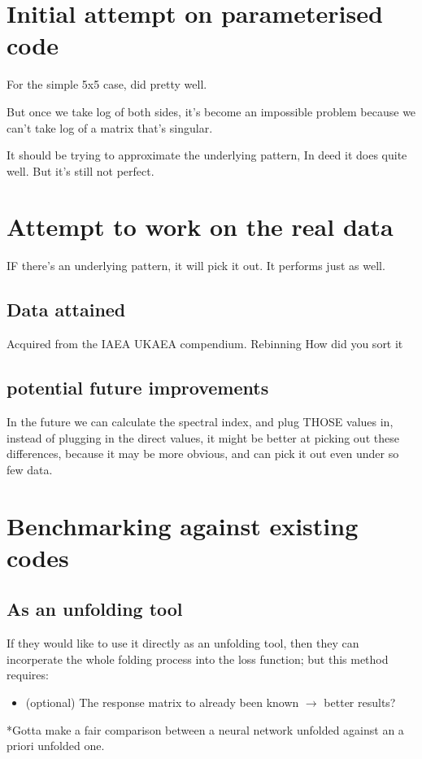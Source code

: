 \documentclass[a4paper, 12pt]{article}
\begin{document}
\section{Initial attempt on parameterised code}
For the simple 5x5 case, did pretty well. 

But once we take log of both sides, it's become an impossible problem because we can't take log of a matrix that's singular.

It should be trying to approximate the underlying pattern,
In deed it does quite well.
But it's still not perfect.

\section{Attempt to work on the real data}
IF there's an underlying pattern, it will pick it out.
It performs just as well.

    \subsection{Data attained}
    Acquired from the IAEA UKAEA compendium.
    Rebinning
    How did you sort it

    \subsection{potential future improvements}
    In the future we can calculate the spectral index, and plug THOSE values in, instead of plugging in the direct values, it might be better at picking out these differences, because it may be more obvious, and can pick it out even under so few data.
\section{Benchmarking against existing codes}
\subsection{As an unfolding tool}
If they would like to use it directly as an unfolding tool, then they can incorperate the whole folding process into the loss function; but this method requires:
\begin{itemize}
    \item (optional) The response matrix to already been known $\rightarrow$ better results?
\end{itemize}
*Gotta make a fair comparison between a neural network unfolded against an a priori unfolded one.
\end{document}

